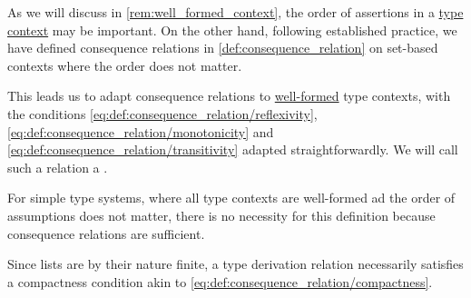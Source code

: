 \begin{definition}\label{def:type_derivation_relation}\mimprovised
  As we will discuss in \cref{rem:well_formed_context}, the order of assertions in a \hyperref[def:type_context]{type context} may be important. On the other hand, following established practice, we have defined consequence relations in \cref{def:consequence_relation} on set-based contexts where the order does not matter.

  This leads us to adapt consequence relations to \hyperref[rem:well_formed_context]{well-formed} type contexts, with the conditions \eqref{eq:def:consequence_relation/reflexivity}, \eqref{eq:def:consequence_relation/monotonicity} and \eqref{eq:def:consequence_relation/transitivity} adapted straightforwardly. We will call such a relation a .
\end{definition}
\begin{comments}
  \item For simple type systems, where all type contexts are well-formed ad the order of assumptions does not matter, there is no necessity for this definition because consequence relations are sufficient.

  \item Since lists are by their nature finite, a type derivation relation necessarily satisfies a compactness condition akin to \eqref{eq:def:consequence_relation/compactness}.
\end{comments}


